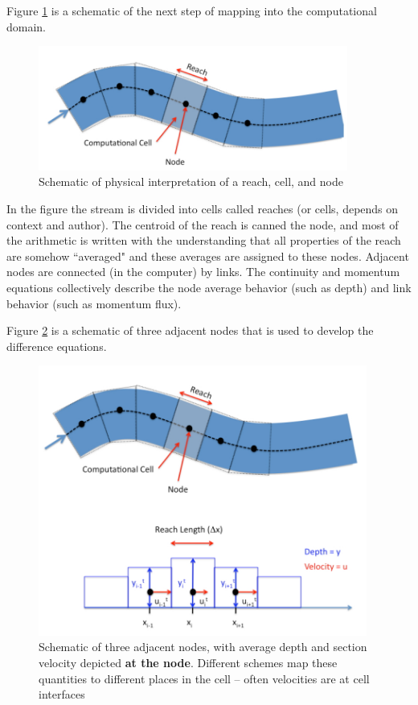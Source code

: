 Figure \ref{fig:stream-discritize} is a schematic of the next step of mapping into the computational domain. 

\begin{figure}[h!] %
   \centering
   \includegraphics[width=4in]{stream-discritize.jpg} 
   \caption{Schematic of physical interpretation of a reach, cell, and node}
   \label{fig:stream-discritize}
\end{figure}

In the figure the stream is divided into cells called reaches (or cells, depends on context and author).
The centroid of the reach is canned the node, and most of the arithmetic is written with the
understanding that all properties of the reach are somehow ``averaged" and these averages
are assigned to these nodes. 
Adjacent nodes are connected (in the computer) by links.
The continuity and momentum equations collectively describe the node average behavior (such
as depth) and link behavior (such as momentum flux).

Figure \ref{fig:stream-node-scheme} is a schematic of three adjacent nodes that is used to develop the difference equations.

\begin{figure}[h!] %
   \centering
   \includegraphics[width=4.25in]{stream-node-scheme.jpg} 
   \caption{Schematic of three adjacent nodes, with average depth and section velocity depicted \textbf{at the node}.
   Different schemes map these quantities to different places in the cell -- often velocities are at cell interfaces}
   \label{fig:stream-node-scheme}
\end{figure}

